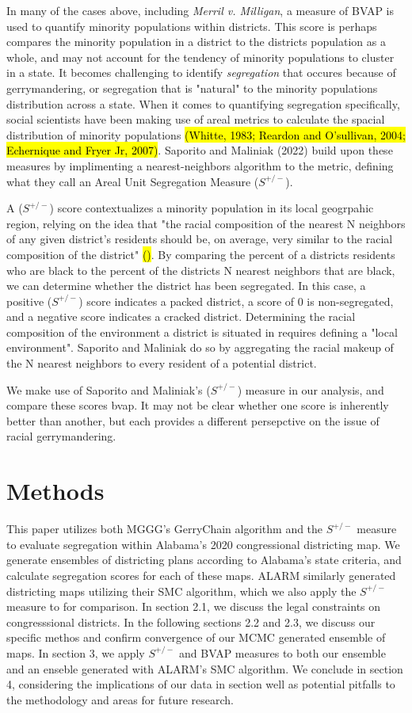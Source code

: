\documentclass{article}
\begin{document}
In many of the cases above, including \emph{Merril v. Milligan}, a measure of BVAP is used to quantify minority populations within districts. This score is perhaps compares the minority population in a district to the districts population as a whole, and may not account for the tendency of minority populations to cluster in a state. It becomes challenging to identify \emph{segregation} that occures because of gerrymandering, or segregation that is "natural" to the minority populations distribution across a state. When it comes to quantifying segregation specifically, social scientists have been making use of areal metrics to calculate the spacial distribution of minority populations \hl{(Whitte, 1983; Reardon and O'sullivan, 2004; Echernique and Fryer Jr, 2007)}. Saporito and Maliniak (2022) build upon these measures by implimenting a nearest-neighbors algorithm to the metric, defining what they call an Areal Unit Segregation Measure ($S^{+/-}$).
\par
A ($S^{+/-}$) score contextualizes a minority population in its local geogrpahic region, relying on the idea that "the racial composition of the nearest N neighbors of any given district’s residents should be, on average, very similar to the racial composition of the district" \hl{()}. By comparing the percent of a districts residents who are black to the percent of the districts N nearest neighbors that are black, we can determine whether the district has been segregated. In this case, a positive ($S^{+/-}$) score indicates a packed district, a score of 0 is non-segregated, and a negative score indicates a cracked district. Determining the racial composition of the environment a district is situated in requires defining a "local environment". Saporito and Maliniak do so by aggregating the racial makeup of the N nearest neighbors to every resident of a potential district.
\par
We make use of Saporito and Maliniak's ($S^{+/-}$) measure in our analysis, and compare these scores bvap. It may not be clear whether one score is inherently better than another, but each provides a different persepctive on the issue of racial gerrymandering.

\section{Methods}\label{methods}
This paper utilizes both MGGG's GerryChain algorithm and the $S^{+/-}$ measure to evaluate segregation within Alabama's 2020 congressional districting map. We generate ensembles of districting plans according to Alabama's state criteria, and calculate segregation scores for each of these maps. ALARM similarly generated districting maps utilizing their SMC algorithm, which we also apply the $S^{+/-}$ measure to for comparison. In section 2.1, we discuss the legal constraints on congresssional districts. In the following sections 2.2 and 2.3, we discuss our specific methos and confirm convergence of our MCMC generated ensemble of maps. In section 3, we apply $S^{+/-}$ and BVAP measures to both our ensemble and an enseble generated with ALARM's SMC algorithm. We conclude in section 4, considering the implications of our data in section well as potential pitfalls to the methodology and areas for future research.
\end{document}
